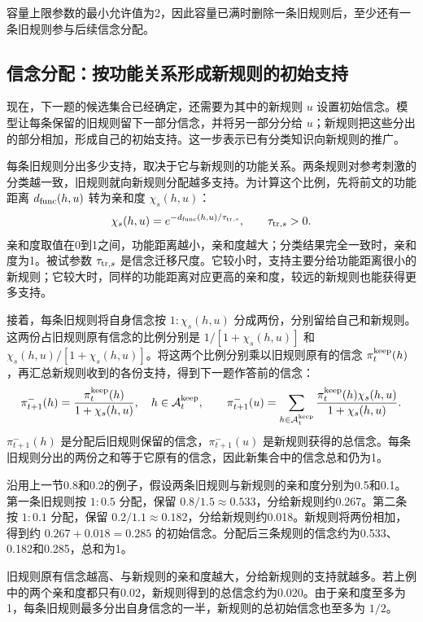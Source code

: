 \documentclass[12pt]{article}
\begin{document}
容量上限参数的最小允许值为2，因此容量已满时删除一条旧规则后，至少还有一条旧规则参与后续信念分配。

\subsection{信念分配：按功能关系形成新规则的初始支持}

现在，下一题的候选集合已经确定，还需要为其中的新规则 $u$ 设置初始信念。模型让每条保留的旧规则留下一部分信念，并将另一部分分给 $u$；新规则把这些分出的部分相加，形成自己的初始支持。这一步表示已有分类知识向新规则的推广。

每条旧规则分出多少支持，取决于它与新规则的功能关系。两条规则对参考刺激的分类越一致，旧规则就向新规则分配越多支持。为计算这个比例，先将前文的功能距离 $d_{\rm func}(h,u)$ 转为亲和度 $\chi_s(h,u)$：
\begin{equation}
\chi_s(h,u)=e^{-d_{\rm func}(h,u)/\tau_{{\rm tr},s}},\qquad\tau_{{\rm tr},s}>0.
\label{eq:affinity}
\end{equation}
亲和度取值在0到1之间，功能距离越小，亲和度越大；分类结果完全一致时，亲和度为1。被试参数 $\tau_{{\rm tr},s}$ 是信念迁移尺度。它较小时，支持主要分给功能距离很小的新规则；它较大时，同样的功能距离对应更高的亲和度，较远的新规则也能获得更多支持。

接着，每条旧规则将自身信念按 $1:\chi_s(h,u)$ 分成两份，分别留给自己和新规则。这两份占旧规则原有信念的比例分别是 $1/[1+\chi_s(h,u)]$ 和 $\chi_s(h,u)/[1+\chi_s(h,u)]$。将这两个比例分别乘以旧规则原有的信念 $\pi_t^{\rm keep}(h)$，再汇总新规则收到的各份支持，得到下一题作答前的信念：
\begin{equation}
\pi_{t+1}^-(h)=\frac{\pi_t^{\rm keep}(h)}{1+\chi_s(h,u)},\quad h\in\mathcal A_t^{\rm keep},
\qquad
\pi_{t+1}^-(u)=\sum_{h\in\mathcal A_t^{\rm keep}}
\frac{\pi_t^{\rm keep}(h)\chi_s(h,u)}{1+\chi_s(h,u)}.
\label{eq:transport}
\end{equation}
$\pi_{t+1}^-(h)$ 是分配后旧规则保留的信念，$\pi_{t+1}^-(u)$ 是新规则获得的总信念。每条旧规则分出的两份之和等于它原有的信念，因此新集合中的信念总和仍为1。

沿用上一节0.8和0.2的例子，假设两条旧规则与新规则的亲和度分别为0.5和0.1。第一条旧规则按 $1:0.5$ 分配，保留 $0.8/1.5\approx0.533$，分给新规则约0.267。第二条按 $1:0.1$ 分配，保留 $0.2/1.1\approx0.182$，分给新规则约0.018。新规则将两份相加，得到约 $0.267+0.018=0.285$ 的初始信念。分配后三条规则的信念约为0.533、0.182和0.285，总和为1。

旧规则原有信念越高、与新规则的亲和度越大，分给新规则的支持就越多。若上例中的两个亲和度都只有0.02，新规则得到的总信念约为0.020。由于亲和度至多为1，每条旧规则最多分出自身信念的一半，新规则的总初始信念也至多为 $1/2$。
\end{document}
